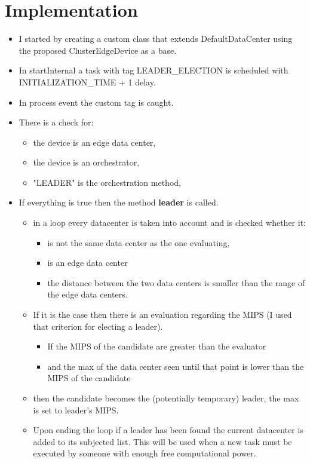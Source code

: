 \documentclass[12pt, a4paper]{report} %
\begin{document}
\section*{Implementation}
\begin{itemize}
 	\item I started by creating a custom class that extends 	DefaultDataCenter using the proposed ClusterEdgeDevice as a base.
 	\item In startInternal a task with tag LEADER\_ELECTION is scheduled with INITIALIZATION\_TIME + 1 delay.
 	\item In process event the custom tag is caught.
 	\item There is a check for:
 	\begin{itemize}
 		\item the device is an edge data center,
 		\item the device is an orchestrator,
 		\item "LEADER" is the orchestration method,
  	\end{itemize}
  	\item If everything is true then the method \textbf{leader} is called.
  	\begin{itemize}
 		\item in a loop every datacenter is taken into account and is checked whether it:
 		\begin{itemize}
 			\item is not the same data center as the one evaluating,
 			\item is an edge data center
 			\item the distance between the two data centers is smaller than the range of the edge data centers.
 		\end{itemize}
 		\item If it is the case then there is an evaluation regarding the MIPS (I used that criterion for electing a leader).
 		\begin{itemize}
 			\item If the MIPS of the candidate are greater than the evaluator
 			\item and the max of the data center seen until that point is lower than the MIPS of the candidate
 		\end{itemize}
 		\item then the candidate becomes the (potentially temporary) leader, the max is set to leader's MIPS.
 		\item Upon ending the loop if a leader has been found the current datacenter is added to its subjected list. This will be used when a new task must be executed by someone with enough free computational power.
  	\end{itemize}
  	
\end{itemize}
\end{document}
